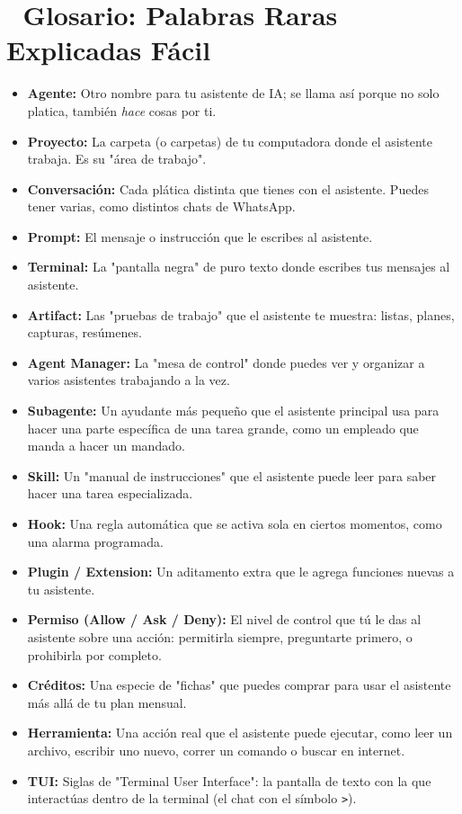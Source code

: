 \documentclass[12pt]{article}
\begin{document}
\section{📖 Glosario: Palabras Raras Explicadas Fácil}
\begin{itemize}
    \item \textbf{Agente:} Otro nombre para tu asistente de IA; se llama así porque no solo platica, también \textit{hace} cosas por ti.
    \item \textbf{Proyecto:} La carpeta (o carpetas) de tu computadora donde el asistente trabaja. Es su "área de trabajo".
    \item \textbf{Conversación:} Cada plática distinta que tienes con el asistente. Puedes tener varias, como distintos chats de WhatsApp.
    \item \textbf{Prompt:} El mensaje o instrucción que le escribes al asistente.
    \item \textbf{Terminal:} La "pantalla negra" de puro texto donde escribes tus mensajes al asistente.
    \item \textbf{Artifact:} Las "pruebas de trabajo" que el asistente te muestra: listas, planes, capturas, resúmenes.
    \item \textbf{Agent Manager:} La "mesa de control" donde puedes ver y organizar a varios asistentes trabajando a la vez.
    \item \textbf{Subagente:} Un ayudante más pequeño que el asistente principal usa para hacer una parte específica de una tarea grande, como un empleado que manda a hacer un mandado.
    \item \textbf{Skill:} Un "manual de instrucciones" que el asistente puede leer para saber hacer una tarea especializada.
    \item \textbf{Hook:} Una regla automática que se activa sola en ciertos momentos, como una alarma programada.
    \item \textbf{Plugin / Extension:} Un aditamento extra que le agrega funciones nuevas a tu asistente.
    \item \textbf{Permiso (Allow / Ask / Deny):} El nivel de control que tú le das al asistente sobre una acción: permitirla siempre, preguntarte primero, o prohibirla por completo.
    \item \textbf{Créditos:} Una especie de "fichas" que puedes comprar para usar el asistente más allá de tu plan mensual.
    \item \textbf{Herramienta:} Una acción real que el asistente puede ejecutar, como leer un archivo, escribir uno nuevo, correr un comando o buscar en internet.
    \item \textbf{TUI:} Siglas de "Terminal User Interface": la pantalla de texto con la que interactúas dentro de la terminal (el chat con el símbolo \texttt{>}).
\end{itemize}
\end{document}
